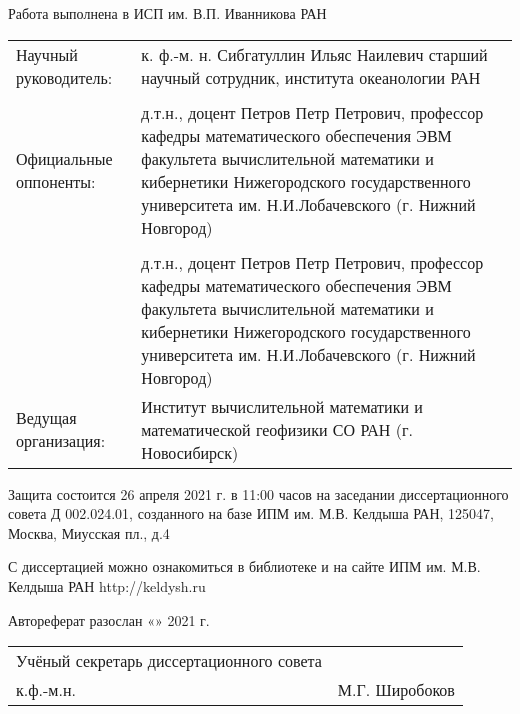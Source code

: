 \documentclass[utf8x]{G7-32} %
\begin{document}
\newpage
\pagestyle{empty}
\begin{spacing}{1.2}
\pagestyle{empty}
\begin{flushleft}
  Работа выполнена в ИСП им. В.П. Иванникова РАН
\end{flushleft}
\pagestyle{empty}
\begin{flushleft}
\begin{tabular}{p{5.8cm} p{10.5cm}}
    Научный руководитель: & к. ф.-м. н. Сибгатуллин Ильяс Наилевич старший научный сотрудник, института океанологии РАН  \\

    \\

    Официальные оппоненты: & д.т.н., доцент Петров Петр Петрович, профессор кафедры математического обеспечения ЭВМ факультета вычислительной математики и кибернетики Нижегородского государственного университета им. Н.И.Лобачевского (г. Нижний Новгород)\\

    \\

    & д.т.н., доцент Петров Петр Петрович, профессор кафедры математического обеспечения ЭВМ факультета вычислительной математики и кибернетики Нижегородского государственного университета им. Н.И.Лобачевского (г. Нижний Новгород)
    
    \\

    Ведущая организация: & Институт вычислительной математики и математической геофизики СО РАН (г. Новосибирск)
    
\end{tabular}
\end{flushleft}

\begin{flushleft}
    Защита состоится 26 апреля 2021 г. в 11:00 часов на заседании диссертационного совета Д 002.024.01, созданного на базе ИПМ им. М.В. Келдыша РАН, 125047, Москва, Миусская пл., д.4

    \setlength{\parskip}{1em}

    С диссертацией можно ознакомиться в библиотеке и на сайте ИПМ им. М.В. Келдыша РАН http://keldysh.ru 

    \setlength{\parskip}{1em}

    Автореферат разослан «\underline{\hspace{1cm}}» \underline{\hspace{4cm}} 2021 г.    
\end{flushleft}

\setlength{\parskip}{1em}

\begin{flushleft}
    \begin{tabular}{p{10cm} p{5cm}}

        Учёный секретарь диссертационного совета \\ к.ф.-м.н.  
    &  М.Г. Широбоков 
        
    \end{tabular}
\end{flushleft}
\end{spacing}
\newpage
\end{document}

